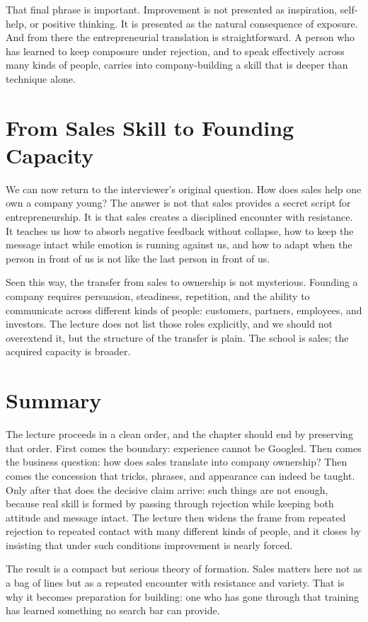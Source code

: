 That final phrase is important. Improvement is not presented as inspiration, self-help, or positive thinking. It is presented as the natural consequence of exposure. And from there the entrepreneurial translation is straightforward. A person who has learned to keep composure under rejection, and to speak effectively across many kinds of people, carries into company-building a skill that is deeper than technique alone.

\section{From Sales Skill to Founding Capacity}

We can now return to the interviewer's original question. How does sales help one own a company young? The answer is not that sales provides a secret script for entrepreneurship. It is that sales creates a disciplined encounter with resistance. It teaches us how to absorb negative feedback without collapse, how to keep the message intact while emotion is running against us, and how to adapt when the person in front of us is not like the last person in front of us.

Seen this way, the transfer from sales to ownership is not mysterious. Founding a company requires persuasion, steadiness, repetition, and the ability to communicate across different kinds of people: customers, partners, employees, and investors. The lecture does not list those roles explicitly, and we should not overextend it, but the structure of the transfer is plain. The school is sales; the acquired capacity is broader.

\section{Summary}

The lecture proceeds in a clean order, and the chapter should end by preserving that order. First comes the boundary: experience cannot be Googled. Then comes the business question: how does sales translate into company ownership? Then comes the concession that tricks, phrases, and appearance can indeed be taught. Only after that does the decisive claim arrive: such things are not enough, because real skill is formed by passing through rejection while keeping both attitude and message intact. The lecture then widens the frame from repeated rejection to repeated contact with many different kinds of people, and it closes by insisting that under such conditions improvement is nearly forced.

The result is a compact but serious theory of formation. Sales matters here not as a bag of lines but as a repeated encounter with resistance and variety. That is why it becomes preparation for building: one who has gone through that training has learned something no search bar can provide.